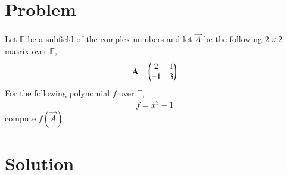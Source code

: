 \documentclass[journal,12pt,twocolumn]{IEEEtran}
\begin{document}
\section{\textbf{Problem}}
Let $\mathbb{F}$ be a subfield of the complex numbers and let $\vec{A}$ be the following $2 \times 2$ matrix over $\mathbb{F}$,
\begin{align*}
\mathbf{A} = \begin{pmatrix}2&1\\-1&3\end{pmatrix}
\end{align*}
For the following polynomial $f$ over $\mathbb{F}$,
\begin{align*}
f = x^3 - 1
\end{align*}
compute $f(\vec{A})$
\section{\textbf{Solution}}
\end{document}
